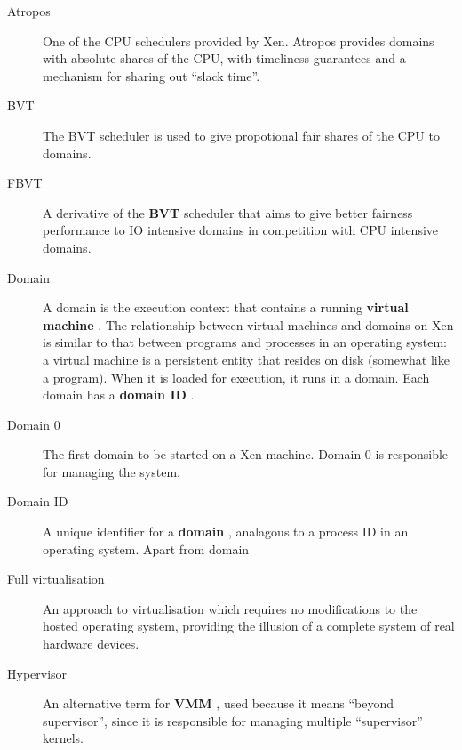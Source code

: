 \documentclass[11pt,twoside,final,openright]{xenstyle}
\begin{document}
\begin{description}
\item[Atropos]             One of the CPU schedulers provided by Xen.
                           Atropos provides domains with absolute shares
			   of the CPU, with timeliness guarantees and a
			   mechanism for sharing out ``slack time''.

\item[BVT]                 The BVT scheduler is used to give propotional
                           fair shares of the CPU to domains.

\item[FBVT]                A derivative of the { \bf BVT } scheduler that
                           aims to give better fairness performance to IO
			   intensive domains in competition with CPU
			   intensive domains.

\item[Domain]              A domain is the execution context that
                           contains a running { \bf virtual machine }.
			   The relationship between virtual machines
			   and domains on Xen is similar to that between
			   programs and processes in an operating
			   system: a virtual machine is a persistent
			   entity that resides on disk (somewhat like
			   a program).  When it is loaded for execution,
			   it runs in a domain.  Each domain has a
			   { \bf domain ID }.

\item[Domain 0]            The first domain to be started on a Xen
                           machine.  Domain 0 is responsible for managing
			   the system.

\item[Domain ID]           A unique identifier for a { \bf domain },
                           analagous to a process ID in an operating
			   system.  Apart from domain

\item[Full virtualisation] An approach to virtualisation which
                           requires no modifications to the hosted
                           operating system, providing the illusion of
                           a complete system of real hardware devices.

\item[Hypervisor]          An alternative term for { \bf VMM }, used
                           because it means ``beyond supervisor'',
			   since it is responsible for managing multiple
			   ``supervisor'' kernels.


\end{description}
\end{document}
